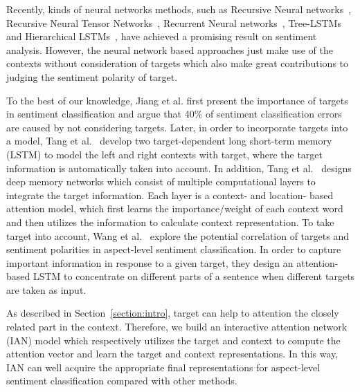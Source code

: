 \documentclass{article}
\begin{document}
Recently, kinds of neural networks methods, such as Recursive Neural networks~\cite{socher2011semi,dong2014adaptive,qian2015learning}, Recursive Neural Tensor Networks~\cite{socher2013recursive}, Recurrent Neural networks~\cite{mikolov2010recurrent,tang2015effective}, Tree-LSTMs~\cite{tai2015improved} and Hierarchical LSTMs~\cite{ruder2016hierarchical}, have achieved a promising result on sentiment analysis. However, the neural network based  approaches just make use of the contexts without consideration of  targets which also make great contributions to judging the sentiment polarity of target. 

To the best of our knowledge, Jiang et al.  first present the importance of targets in sentiment classification and argue that 40\% of sentiment classification errors are caused by not considering targets. 
Later, in order to incorporate  targets into a model, Tang et al.~ develop two target-dependent long short-term memory (LSTM) to model the left and right contexts with target, where the target information is automatically taken into account.
In addition, Tang et al.~ designs deep memory networks which consist of multiple computational layers to integrate the target information. Each layer is a context- and location- based attention model, which first learns the importance/weight of each context word and then utilizes the information to calculate  context representation.
To take target into account, Wang et al.~ explore the potential correlation of targets and sentiment polarities in aspect-level sentiment classification. 
In order to capture important information in response to a given target, they design an attention-based LSTM to concentrate on different parts of a sentence when different targets are taken as input.

As described in Section~\ref{section:intro}, target can help to attention the closely related part in the context. Therefore, we build an interactive attention network (IAN) model which respectively utilizes the target and context to compute the attention vector and learn the target and context representations. In this way, IAN can well acquire the appropriate final representations for aspect-level sentiment classification compared with other methods.
\end{document}
